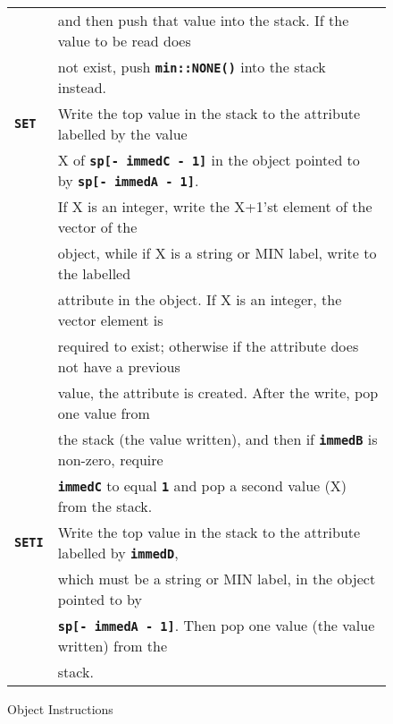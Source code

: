 \documentclass[12pt]{article}
\makeatletter
\newcommand{\TT}[1]{{\tt \bfseries #1}}
\newcommand{\ttkey}[1]{\TT{#1}\index{#1@{\tt #1}}}
\newlength{\figurewidth}
\newenvironment{boxedfigure}[1][!btp]%
	{\begin{figure*}[#1]
	 \begin{lrbox}{\figurebox}
	 \begin{minipage}{\figurewidth}

	 \vspace*{1ex}}%
	{
	 \vspace*{1ex}

	 \end{minipage}
	 \end{lrbox}

	 \centering
	 \fbox{\hspace*{0.1in}\usebox{\figurebox}\hspace*{0.1in}}
	 \end{figure*}}
\makeatother
\begin{document}
\begin{boxedfigure}
\begin{center}
\begin{tabular}{|l|l|}
    & and then push that value into the stack.  If the value to be read does \\
    & not exist, push \TT{min::NONE()} into the stack instead.
\\\hline
\ttkey{SET}
    & Write the top value in the stack to the attribute labelled by the value \\
    & X of \TT{sp[- immedC - 1]} in the object pointed to by
    	\TT{sp[- immedA - 1]}. \\
    & If X is an integer, write the X+1'st element of the vector of the \\
    & object, while if X is a string or MIN label, write to the labelled \\
    & attribute in the object.  If X is an integer, the vector element is \\
    & required to exist; otherwise if the attribute does not have a previous \\
    & value, the attribute is created.  After the write, pop one value from \\
    & the stack (the value written), and then if \TT{immedB} is non-zero, 
        require \\
    & \TT{immedC} to equal \TT{1} and pop a second value (X)
	    from the stack.
\\\hline
\ttkey{SETI}
    & Write the top value in the stack to the attribute labelled
        by \TT{immedD}, \\
    & which must be a string or MIN label, in the object pointed to by \\
    & \TT{sp[- immedA - 1]}.  Then pop one value (the value written) from the \\
    & stack.
\\\hline
\end{tabular}
\end{center}
\vspace*{-3ex}
\caption{Object Instructions}
\label{OBJECT-INSTRUCTIONS}
\end{boxedfigure}

\clearpage
\end{document}
